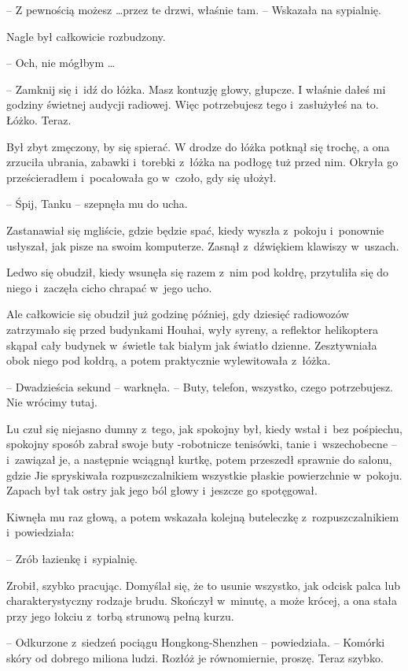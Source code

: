 \documentclass[oneside,polish,11pt,rmheadings]{mwbk}
\begin{document}
-- Z pewnością możesz \ldots  przez te drzwi, właśnie tam. -- Wskazała na sypialnię.

Nagle był całkowicie rozbudzony.

-- Och, nie mógłbym \ldots 

-- Zamknij się i~idź do łóżka. Masz kontuzję głowy, głupcze. I właśnie dałeś mi godziny świetnej audycji radiowej. Więc potrzebujesz tego i~zasłużyłeś na to. Łóżko. Teraz.

Był zbyt zmęczony, by się spierać. W drodze do łóżka potknął się trochę, a ona zrzuciła ubrania, zabawki i~torebki z~łóżka na podłogę tuż przed nim. Okryła go prześcieradłem i~pocałowała go w~czoło, gdy się ułożył. 

-- Śpij, Tanku -- szepnęła mu do ucha.

Zastanawiał się mgliście, gdzie będzie spać, kiedy wyszła z~pokoju i~ponownie usłyszał, jak pisze na swoim komputerze. Zasnął z~dźwiękiem klawiszy w~uszach.

Ledwo się obudził, kiedy wsunęła się razem z~nim pod kołdrę, przytuliła się do niego i~zaczęła cicho chrapać w~jego ucho.

Ale całkowicie się obudził już godzinę później, gdy dziesięć radiowozów zatrzymało się przed budynkami Houhai, wyły syreny, a reflektor helikoptera skąpał cały budynek w~świetle tak białym jak światło dzienne. Zesztywniała obok niego pod kołdrą, a potem praktycznie wylewitowała z~łóżka.

-- Dwadzieścia sekund -- warknęła. -- Buty, telefon, wszystko, czego potrzebujesz. Nie wrócimy tutaj. 

Lu czuł się niejasno dumny z~tego, jak spokojny był, kiedy wstał i~bez pośpiechu, spokojny sposób zabrał swoje buty -robotnicze tenisówki, tanie i~wszechobecne -- i~zawiązał je, a następnie wciągnął kurtkę, potem przeszedł sprawnie do salonu, gdzie Jie spryskiwała rozpuszczalnikiem wszystkie płaskie powierzchnie w~pokoju. Zapach był tak ostry jak jego ból głowy i~jeszcze go spotęgował.

Kiwnęła mu raz głową, a potem wskazała kolejną buteleczkę z~rozpuszczalnikiem i~powiedziała: 

-- Zrób łazienkę i~sypialnię. 

Zrobił, szybko pracując. Domyślał się, że to usunie wszystko, jak odcisk palca lub charakterystyczny rodzaje brudu. Skończył w~minutę, a może krócej, a ona stała przy jego łokciu z~torbą strunową pełną kurzu. 

-- Odkurzone z~siedzeń pociągu Hongkong-Shenzhen -- powiedziała. -- Komórki skóry od dobrego miliona ludzi. Rozłóż je równomiernie, proszę. Teraz szybko.
\end{document}
